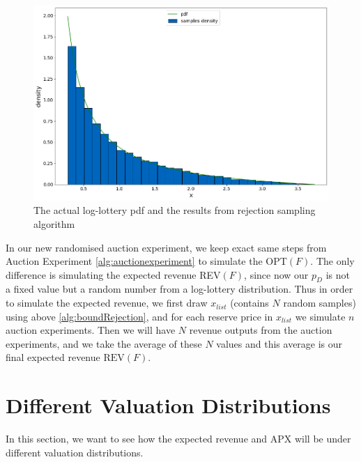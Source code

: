 \begin{figure}[H]
	\centering
	\includegraphics[width=1\textwidth]{rejectionS}
	\caption{The actual log-lottery pdf and the results from rejection sampling algorithm}
	\label{fig:rejectionS}
\end{figure} 

In our new randomised auction experiment, we keep exact same steps from Auction Experiment \ref{alg:auctionexperiment} to simulate the OPT$(F)$. The only difference is simulating the expected revenue REV$(F)$, since now our $p_D$ is not a fixed value but a random number from a log-lottery distribution. Thus in order to simulate the expected revenue, we first draw $x_{list}$ (contains $N$ random samples) using above \cref{alg:boundRejection}, and for each reserve price in $x_{list}$ we simulate $n$ auction experiments. Then we will have $N$ revenue outputs from the auction experiments, and we take the average of these $N$ values and this average is our final expected revenue $\text{REV}(F)$.


\newpage
\section{Different Valuation Distributions}
In this section, we want to see how the expected revenue and APX will be under different valuation distributions.
